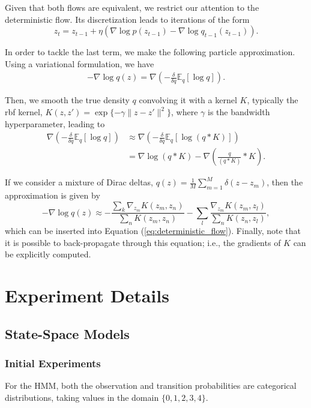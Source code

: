 Given that both flows are equivalent, we restrict our attention to the deterministic flow. Its discretization leads to iterations of the form
\begin{equation}\label{eq:deterministic_flow}
z_{t} = z_{t-1} + \eta (\nabla \log p(z_{t-1}) - \nabla \log q_{t-1} (z_{t-1})).
\end{equation}

In order to tackle the last term, we make the following particle approximation. Using a variational formulation, we have 
\begin{align*}
    - \nabla \log q(z) = \nabla \left( - \frac{\delta}{\delta q} \mathbb{E}_q \left[ \log q\right] \right).
\end{align*}

Then, we smooth the true density $q$ convolving it with a kernel $K$, typically the rbf %
kernel, $K(z, z') = \exp \lbrace - \gamma \| z - z' \|^2 \rbrace$, where $\gamma$ is the bandwidth hyperparameter, leading to
\begin{align*}
    \nabla \left( - \frac{\delta}{\delta q} \mathbb{E}_q \left[ \log q\right] \right) &\approx
     \nabla \left( - \frac{\delta}{\delta q} \mathbb{E}_q \left[ \log (q\ast K )\right] \right) \\
     &= \nabla \log (q \ast K) - \nabla \left( \frac{q}{(q \ast K)} \ast K \right).
\end{align*}

If we consider a mixture of Dirac deltas, $q(z) = \frac{1}{M} \sum_{m=1}^M \delta(z - z_m)$, then the approximation is given 
by
$$
- \nabla \log q(z) \approx - \frac{\sum_k \nabla_{z_m} K(z_m, z_n)}{\sum_n K(z_m, z_n)}
- \sum_l \frac{\nabla_{z_m} K(z_m, z_l)}{\sum_n K(z_n, z_l)},
$$
which can be inserted into Equation (\ref{eq:deterministic_flow}). Finally, note that
it is possible to back-propagate through this equation; i.e., the gradients of $K$ can be explicitly computed.

\section{Experiment Details}\label{sec:detail}


\subsection{State-Space Models}\label{app:ss}

\subsubsection{Initial Experiments}\label{app:hmm}
For the HMM, both the observation and transition probabilities are categorical distributions, taking values in the domain $\lbrace 0, 1, 2, 3, 4 \rbrace$.

